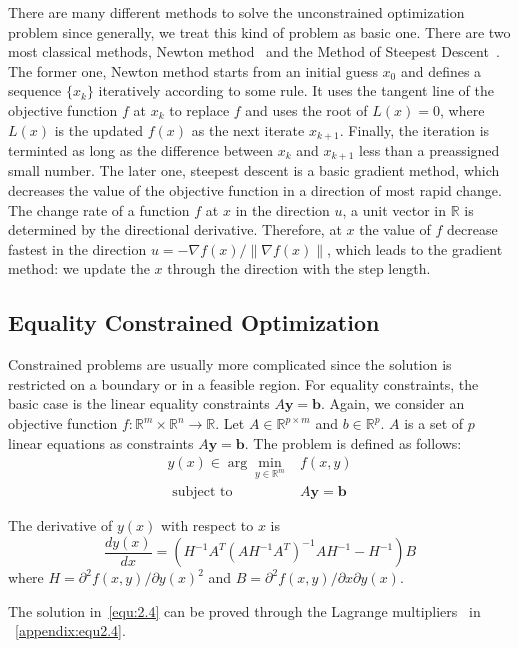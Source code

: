 \par There are many different methods to solve the unconstrained optimization problem since generally, we treat this kind of problem as basic one. There are two most classical methods, Newton method~\citep{NT:36} and the Method of Steepest Descent~\citep{DP:09}. The former one, Newton method starts from an initial guess $x_0$ and defines a sequence $\{x_k\}$
iteratively according to some rule. It uses the tangent line of the objective function $f$ at $x_k$ to replace $f$ and uses the root of $L(x) = 0$, where $L(x)$ is the updated $f(x)$ as the next iterate $x_{k+1}$. Finally, the iteration is terminted as long as the difference between $x_k$ and $x_{k+1}$ less than a preassigned small number. The later one, steepest descent is a basic gradient method, which decreases the value of the objective function in a direction of most rapid change. The change rate of a function $f$ at $x$ in the direction $u$, a unit vector in $\mathbb{R}$ is determined by the directional derivative. Therefore, at $x$ the value of $f$ decrease fastest in the direction $u=-\nabla f(x)/\|\nabla f(x)\|$, which leads to the gradient method: we update the $x$ through the direction with the step length. 


\subsection{Equality Constrained Optimization}
Constrained problems are usually more complicated since the solution is restricted on a boundary or in a feasible region. For equality constraints, the basic case is the linear equality constraints $A \boldsymbol{y} = \boldsymbol{b}$. Again, we consider an objective function $f: \mathbb{R}^{m} \times \mathbb{R}^{n} \rightarrow \mathbb{R}$. Let $A \in \mathbb{R}^{p \times m}$ and $b \in \mathbb{R}^{p}$. $A$ is a set of $p$ linear equations as constraints $A \boldsymbol{y} = \boldsymbol{b}$. The problem is defined as follows:
$$
\begin{array}{rl}y(x) \in \arg \min _{y \in \mathbb{R}^{m}} & f(x, y) \\ \textrm { subject to } & A \boldsymbol{y}=\boldsymbol{b}\end{array}
$$
\par The derivative of $y(x)$ with respect to $x$ is
\begin{equation}
    \label{equ:2.4}
    \frac{dy(x)}{dx} = \left(H^{-1} A^{T}\left(A H^{-1} A^{T}\right)^{-1} A H^{-1}-H^{-1}\right) B
\end{equation}
where $H = \partial^{2} f(x, y) / \partial y(x)^2$ and $B = \partial^{2} f(x, y) / \partial x \partial y(x)$. 
\par The solution in~\ref{equ:2.4} can be proved through the Lagrange multipliers~\citep{BD:14} in ~\ref{appendix:equ2.4}. 



